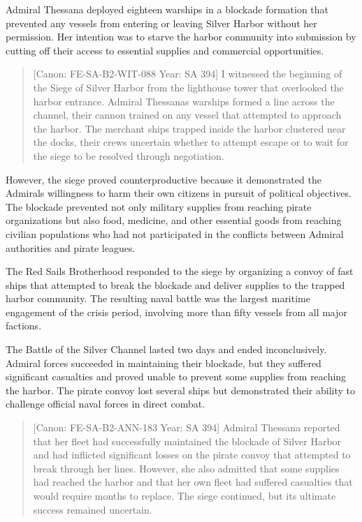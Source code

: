 Admiral Thessana deployed eighteen warships in a blockade formation that
prevented any vessels from entering or leaving Silver Harbor without her
permission. Her intention was to starve the harbor community into
submission by cutting off their access to essential supplies and
commercial opportunities.

\begin{quote}
{[}Canon: FE-SA-B2-WIT-088 \textbar{} Year: SA 394{]} I witnessed the
beginning of the Siege of Silver Harbor from the lighthouse tower that
overlooked the harbor entrance. Admiral Thessana\textquotesingle s
warships formed a line across the channel, their cannon trained on any
vessel that attempted to approach the harbor. The merchant ships trapped
inside the harbor clustered near the docks, their crews uncertain
whether to attempt escape or to wait for the siege to be resolved
through negotiation.
\end{quote}

However, the siege proved counterproductive because it demonstrated the
Admiral\textquotesingle s willingness to harm their own citizens in
pursuit of political objectives. The blockade prevented not only
military supplies from reaching pirate organizations but also food,
medicine, and other essential goods from reaching civilian populations
who had not participated in the conflicts between Admiral authorities
and pirate leagues.

The Red Sails Brotherhood responded to the siege by organizing a convoy
of fast ships that attempted to break the blockade and deliver supplies
to the trapped harbor community. The resulting naval battle was the
largest maritime engagement of the crisis period, involving more than
fifty vessels from all major factions.

The Battle of the Silver Channel lasted two days and ended
inconclusively. Admiral forces succeeded in maintaining their blockade,
but they suffered significant casualties and proved unable to prevent
some supplies from reaching the harbor. The pirate convoy lost several
ships but demonstrated their ability to challenge official naval forces
in direct combat.

\begin{quote}
{[}Canon: FE-SA-B2-ANN-183 \textbar{} Year: SA 394{]} Admiral Thessana
reported that her fleet had successfully maintained the blockade of
Silver Harbor and had inflicted significant losses on the pirate convoy
that attempted to break through her lines. However, she also admitted
that some supplies had reached the harbor and that her own fleet had
suffered casualties that would require months to replace. The siege
continued, but its ultimate success remained uncertain.
\end{quote}

